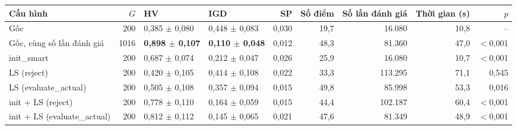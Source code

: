 \begin{tabular}{@{}lrllrrrrr@{}}
\toprule
Cấu hình & $G$ & HV & IGD & SP & Số điểm & Số lần đánh giá & Thời gian (s) & $p$ \\
\midrule
Gốc & 200 & 0{,}385 $\pm$ 0{,}080 & 0{,}448 $\pm$ 0{,}083 & 0{,}030 & 19{,}7 & 16.080 & 10{,}8 & -- \\
Gốc, cùng số lần đánh giá & 1016 & \textbf{0{,}898 $\pm$ 0{,}107} & \textbf{0{,}110 $\pm$ 0{,}048} & 0{,}012 & 48{,}3 & 81.360 & 47{,}0 & $<$0{,}001 \\
init\_smart & 200 & 0{,}687 $\pm$ 0{,}074 & 0{,}212 $\pm$ 0{,}047 & 0{,}026 & 25{,}9 & 16.080 & 10{,}7 & $<$0{,}001 \\
LS (reject) & 200 & 0{,}420 $\pm$ 0{,}105 & 0{,}414 $\pm$ 0{,}108 & 0{,}022 & 33{,}3 & 113.295 & 71{,}1 & 0{,}545 \\
LS (evaluate\_actual) & 200 & 0{,}505 $\pm$ 0{,}108 & 0{,}357 $\pm$ 0{,}094 & 0{,}015 & 49{,}8 & 85.998 & 53{,}3 & 0{,}016 \\
init + LS (reject) & 200 & 0{,}778 $\pm$ 0{,}110 & 0{,}164 $\pm$ 0{,}059 & 0{,}015 & 44{,}4 & 102.187 & 60{,}4 & $<$0{,}001 \\
init + LS (evaluate\_actual) & 200 & 0{,}812 $\pm$ 0{,}112 & 0{,}145 $\pm$ 0{,}065 & 0{,}021 & 47{,}6 & 81.349 & 48{,}9 & $<$0{,}001 \\
\bottomrule
\end{tabular}
